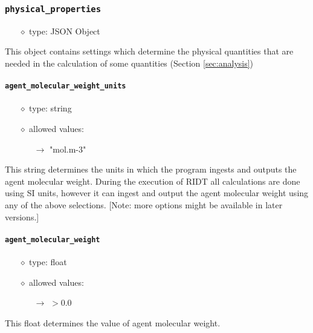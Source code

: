 \documentclass[]{article}
\def\code#1{\texttt{#1}}
\begin{document}
\subsubsection{\code{physical\_properties}}
\begin{itemize}
    \item[$\diamond$] type: JSON Object 
\end{itemize}
This object contains settings which determine the physical quantities that are
needed in the calculation of some quantities (Section \ref{sec:analysis})

\paragraph{\code{agent\_molecular\_weight\_units}}\label{sec:agentmolweightunits}
\begin{itemize}
    \item[$\diamond$] type: string 
    \item[$\diamond$] allowed values:
    \begin{itemize}
        \item[$\rightarrow$] "mol.m-3"
    \end{itemize}
\end{itemize}
This string determines the units in which the program ingests and outputs the
agent molecular weight. During the execution of RIDT all calculations are done
using SI units, however it can ingest and output the agent molecular weight
using any of the above selections. [Note: more options might be available in
later versions.]

\paragraph{\code{agent\_molecular\_weight}}\label{sec:agentmolweight}
\begin{itemize}
    \item[$\diamond$] type: float 
    \item[$\diamond$] allowed values:
    \begin{itemize}
        \item[$\rightarrow$] $>0.0$ 
    \end{itemize}
\end{itemize}
This float determines the value of agent molecular weight.
\end{document}
